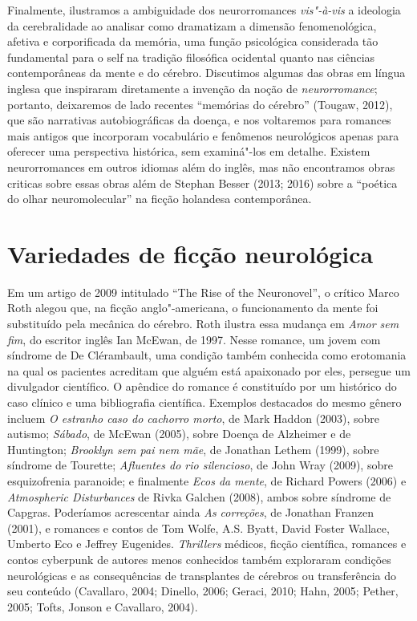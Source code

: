 Finalmente, ilustramos a ambiguidade dos neurorromances \emph{vis"-à-vis}
a ideologia da cerebralidade ao analisar como dramatizam a dimensão
fenomenológica, afetiva e corporificada da memória, uma função
psicológica considerada tão fundamental para o self na tradição
filosófica ocidental quanto nas ciências contemporâneas da mente e do
cérebro. Discutimos algumas das obras em língua inglesa que inspiraram
diretamente a invenção da noção de \emph{neurorromance}; portanto,
deixaremos de lado recentes ``memórias do cérebro'' (Tougaw, 2012), que
são narrativas autobiográficas da doença, e nos voltaremos para romances
mais antigos que incorporam vocabulário e fenômenos neurológicos apenas
para oferecer uma perspectiva histórica, sem examiná"-los em detalhe.
Existem neurorromances em outros idiomas além do inglês, mas não
encontramos obras criticas sobre essas obras além de Stephan Besser
(2013; 2016) sobre a ``poética do olhar neuromolecular'' na ficção
holandesa contemporânea.

\section{Variedades de ficção neurológica}

Em um artigo de 2009 intitulado ``The Rise of the Neuronovel'', o
crítico Marco Roth alegou que, na ficção anglo"-americana, o
funcionamento da mente foi substituído pela mecânica do cérebro. Roth
ilustra essa mudança em \emph{Amor sem fim}, do escritor inglês Ian
McEwan, de 1997. Nesse romance, um jovem com síndrome de De Clérambault,
uma condição também conhecida como erotomania na qual os pacientes
acreditam que alguém está apaixonado por eles, persegue um divulgador
científico. O apêndice do romance é constituído por um histórico do caso
clínico e uma bibliografia científica. Exemplos destacados do mesmo
gênero incluem \emph{O estranho caso do cachorro morto}, de Mark Haddon
(2003), sobre autismo; \emph{Sábado}, de McEwan (2005), sobre Doença de
Alzheimer e de Huntington; \emph{Brooklyn sem pai nem mãe}, de Jonathan
Lethem (1999), sobre síndrome de Tourette; \emph{Afluentes do rio
silencioso}, de John Wray (2009), sobre esquizofrenia paranoide; e
finalmente \emph{Ecos da mente}, de Richard Powers (2006) e
\emph{Atmospheric Disturbances} de Rivka Galchen (2008), ambos sobre
síndrome de Capgras. Poderíamos acrescentar ainda \emph{As correções},
de Jonathan Franzen (2001), e romances e contos de Tom Wolfe, A.S.
Byatt, David Foster Wallace, Umberto Eco e Jeffrey Eugenides.
\emph{Thrillers} médicos, ficção científica, romances e contos cyberpunk
de autores menos conhecidos também exploraram condições neurológicas e
as consequências de transplantes de cérebros ou transferência do seu
conteúdo (Cavallaro, 2004; Dinello, 2006; Geraci, 2010; Hahn, 2005;
Pether, 2005; Tofts, Jonson e Cavallaro, 2004).

